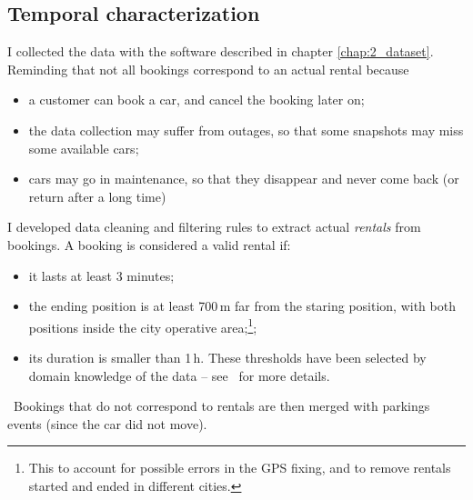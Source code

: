 %
%

\subsection{Temporal characterization}
I collected the data with the software described in chapter \ref{chap:2_dataset}. Reminding that not all bookings correspond to an actual rental because
\begin{itemize}
	\item a customer can book a car, and cancel the booking later on;
	\item the data collection may suffer from outages, so that some snapshots may miss some available cars;
	\item cars may go in maintenance, so that they disappear and never come back (or return after a long time)
\end{itemize}
I developed data cleaning and filtering rules to extract actual \textit{rentals} from bookings. A booking is considered a valid rental if:
\begin{itemize}
	\item it lasts at least 3 minutes;
	\item the ending position is at least 700\,m far from the staring position, with both positions inside the city operative area;\footnote{This to account for possible errors in the GPS fixing, and to remove rentals started and ended in different cities.};
	\item its duration is smaller than 1\,h. These thresholds have been selected by domain knowledge of the data -- see~\cite{UMAP} for more details.
\end{itemize}\
Bookings that do not correspond to rentals are then merged with parkings events (since the car did not move).

